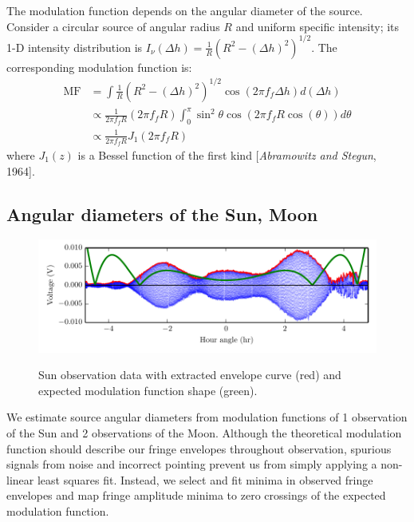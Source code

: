 \documentclass[10pt]{article}
\begin{document}
The modulation function depends on the angular diameter of the source.  Consider a circular source of angular radius $R$ and uniform specific intensity; its 1-D intensity distribution is $I_\nu(\Delta h) = \frac{1}{R} \left( R^2 - (\Delta h)^2 \right)^{1/2}$.  The corresponding modulation function is:
\begin{align*}
    \mathrm{MF} &= \int \frac{1}{R} \left( R^2 - (\Delta h)^2 \right)^{1/2} \cos(2\pi f_f \Delta h) d(\Delta h) \\
                &\propto \frac{1}{2\pi f_f R} \left(2\pi f_f R\right)
                         \int_0^\pi \sin^2 \theta \cos\left(2\pi f_f R \cos(\theta)\right) d\theta \\
                &\propto \frac{1}{2\pi f_f R} J_1 \left(2\pi f_f R \right)
\end{align*}
where $J_1(z)$ is a Bessel function of the first kind [\textit{Abramowitz and Stegun}, 1964].

\subsection{Angular diameters of the Sun, Moon}

\begin{figure}[!ht]
    \centering
    \includegraphics[scale=1]{plots_fitting/sun_fringes_envelopes.pdf} \\
    \caption{Sun observation data with extracted envelope curve (red) and expected modulation function shape (green).}
	\label{fig:sunFringes}
\end{figure}

We estimate source angular diameters from modulation functions of 1 observation of the Sun and 2 observations of the Moon.  Although the theoretical modulation function should describe our fringe envelopes throughout observation, spurious signals from noise and incorrect pointing prevent us from simply applying a non-linear least squares fit.  Instead, we select and fit minima in observed fringe envelopes and map fringe amplitude minima to zero crossings of the expected modulation function.
\end{document}
